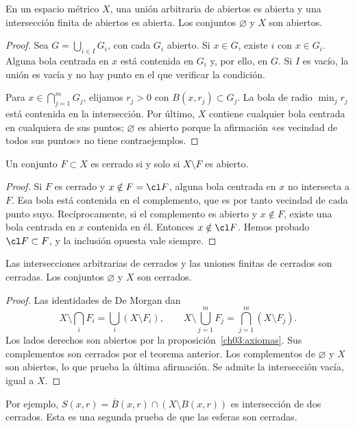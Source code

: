 \begin{proposicion}\label{ch03:axiomas}
En un espacio métrico $X$, una unión arbitraria de abiertos es abierta y una intersección finita de abiertos es abierta. Los conjuntos $\varnothing$ y $X$ son abiertos.
\end{proposicion}
\begin{proof}
Sea $G=\bigcup_{i\in I}G_i$, con cada $G_i$ abierto. Si $x\in G$, existe $i$ con $x\in G_i$. Alguna bola centrada en $x$ está contenida en $G_i$ y, por ello, en $G$. Si $I$ es vacío, la unión es vacía y no hay punto en el que verificar la condición.

Para $x\in\bigcap_{j=1}^mG_j$, elijamos $r_j>0$ con $B(x,r_j)\subset G_j$. La bola de radio $\min_jr_j$ está contenida en la intersección. Por último, $X$ contiene cualquier bola centrada en cualquiera de sus puntos; $\varnothing$ es abierto porque la afirmación «es vecindad de todos sus puntos» no tiene contraejemplos.
\end{proof}

\begin{teorema}\label{ch03:complemento}
Un conjunto $F\subset X$ es cerrado si y solo si $X\setminus F$ es abierto.
\end{teorema}
\begin{proof}
Si $F$ es cerrado y $x\notin F=\cl F$, alguna bola centrada en $x$ no intersecta a $F$. Esa bola está contenida en el complemento, que es por tanto vecindad de cada punto suyo. Recíprocamente, si el complemento es abierto y $x\notin F$, existe una bola centrada en $x$ contenida en él. Entonces $x\notin\cl F$. Hemos probado $\cl F\subset F$, y la inclusión opuesta vale siempre.
\end{proof}

\begin{corolario}\label{ch03:cerrados}
Las intersecciones arbitrarias de cerrados y las uniones finitas de cerrados son cerradas. Los conjuntos $\varnothing$ y $X$ son cerrados.
\end{corolario}
\begin{proof}
Las identidades de De Morgan dan
\[
X\setminus\bigcap_iF_i=\bigcup_i(X\setminus F_i),\qquad
X\setminus\bigcup_{j=1}^mF_j=\bigcap_{j=1}^m(X\setminus F_j).
\]
Los lados derechos son abiertos por la proposición~\ref{ch03:axiomas}. Sus complementos son cerrados por el teorema anterior. Los complementos de $\varnothing$ y $X$ son abiertos, lo que prueba la última afirmación. Se admite la intersección vacía, igual a $X$.
\end{proof}
Por ejemplo, $S(x,r)=\overline B(x,r)\cap(X\setminus B(x,r))$ es intersección de dos cerrados. Esta es una segunda prueba de que las esferas son cerradas.

